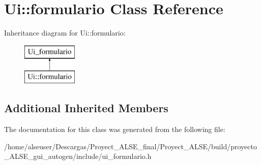 \hypertarget{class_ui_1_1formulario}{}\section{Ui\+:\+:formulario Class Reference}
\label{class_ui_1_1formulario}
Inheritance diagram for Ui\+:\+:formulario\+:\begin{figure}[H]
\begin{center}
\leavevmode
\includegraphics[height=2.000000cm]{class_ui_1_1formulario}
\end{center}
\end{figure}
\subsection*{Additional Inherited Members}


The documentation for this class was generated from the following file\+:\begin{DoxyCompactItemize}
\item 
/home/alseuser/\+Descargas/\+Proyect\+\_\+\+A\+L\+S\+E\+\_\+final/\+Proyect\+\_\+\+A\+L\+S\+E/build/proyecto\+\_\+\+A\+L\+S\+E\+\_\+gui\+\_\+autogen/include/ui\+\_\+formulario.\+h\end{DoxyCompactItemize}
